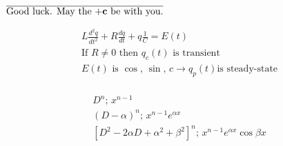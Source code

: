 \documentclass[12pt]{article}
\begin{document}
  \begin{center}
    \Small\vline\textbf{\underline{$\overline{\text{Good luck. May the $\bold{+c}$ be with you.}}$}}\Small\vline
  \end{center}
  \vspace{-30pt}

\begin{multicols}{2}

  \begin{equation*}
    \begin{split}
      L\frac{d^2q}{dt^2}+R\frac{dq}{dt}+q\frac{1}{C}=E(t)\\
      \text{If }R\neq0\text{ then }q_c(t)\text{ is transient}\\
      E(t)\text{ is }\cos,\,\sin,\,c\rightarrow q_p(t)\text{is steady-state}\\
      \end{split}
    \label{1}
  \end{equation*}

  \begin{equation*}
    \begin{split}
      D^n;\,x^{n-1}\\
      (D-\alpha)^n;\,x^{n-1}e^{\alpha x}\\
      [D^2-2\alpha D+\alpha^2+\beta^2]^n;\,x^{n-1}e^{\alpha x}\cos\beta x
    \end{split}
    \label{2}
  \end{equation*}

\end{multicols}
\end{document}
